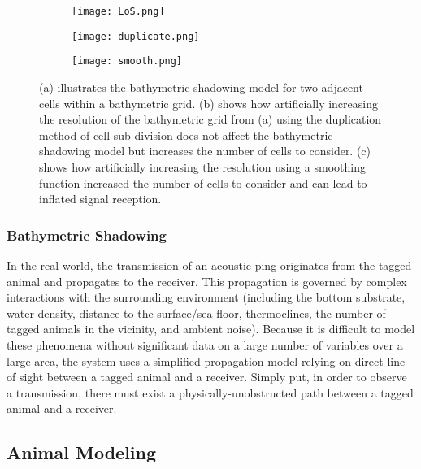 \begin{figure}[ht]
	\begin{subfigure}{.5\textwidth}
		\centering
		\texttt{[image: LoS.png]}
		\caption{
			\label{resolutionScale}}
		\label{LoS}
	\end{subfigure}%
	\begin{subfigure}{.5\textwidth}
		\centering
		\texttt{[image: duplicate.png]}
		\caption{
			\label{duplicate}}
	\end{subfigure}
	\begin{subfigure}{.5\textwidth}
		\centering
		\texttt{[image: smooth.png]}
		\caption{
			\label{smooth}}
	\end{subfigure}
	\caption{(a) illustrates the bathymetric shadowing model for two adjacent cells within a bathymetric grid.  (b) shows how artificially increasing the resolution of the bathymetric grid from (a) using the duplication method of cell sub-division does not affect the bathymetric shadowing model but increases the number of cells to consider.  (c) shows how artificially increasing the resolution using a smoothing function increased the number of cells to consider and can lead to inflated signal reception.}
\end{figure}


\subsubsection{Bathymetric Shadowing}
\label{bathymetricShadowing}
In the real world, the transmission of an acoustic ping originates from the tagged animal and propagates to the receiver.  This propagation is governed by complex interactions with the surrounding environment (including the bottom substrate, water density, distance to the surface/sea-floor, thermoclines, the number of tagged animals in the vicinity, and ambient noise).  Because it is difficult to model these phenomena without significant data on a large number of variables over a large area, the system uses a simplified propagation model relying on direct line of sight between a tagged animal and a receiver.  Simply put, in order to observe a transmission, there must exist a physically-unobstructed path between a tagged animal and a receiver.  




\subsection{Animal Modeling}
\label{animalModeling}

